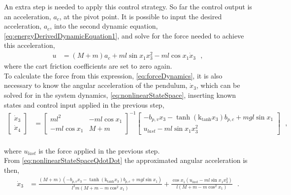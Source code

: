 An extra step is needed to apply this control strategy. So far the control output is an acceleration, $a_c$, at the pivot point. It is possible to input the desired acceleration, $a_c$, into the second dynamic equation, \autoref{eq:energyDerivedDynamicEquation1}, and solve for the force needed to achieve this acceleration,
%
\begin{align}
  u &=  ( M + m )a_c + m l \sin x_1 x_3^2 - m l \cos x_1 \dot{x}_3  \ \ \ ,
  \label{eq:forceDynamics}
\end{align}
%
where the cart friction coefficients are set to zero again.\\
To calculate the force from this expression, \autoref{eq:forceDynamics}, it is also necessary to know the angular acceleration of the pendulum, $\dot{x}_3$, which can be solved for in the system dynamics, \autoref{eq:nonlinearStateSpace}, inserting known states and control input applied in the previous step,
%
\begingroup\makeatletter\def\f@size{10}\check@mathfonts
\def\maketag@@@#1{\hbox{\m@th\normalsize\normalfont#1}}%
\begin{align}
  \begin{bmatrix}
    \dot{x}_3  \\
    \dot{x}_4
  \end{bmatrix}
  &=
  \begin{bmatrix}
    m l^2           & -m l \cos x_1  \\
    -m l \cos x_1   & M + m
  \end{bmatrix}^{-1}
  \begin{bmatrix}
    - b_{p,v} x_3 - \tanh(\text{k}_\text{tanh}x_3) b_{p,c} + m g l \sin x_1 \\
    u_{last} - m l \sin x_1 x_3^2
  \end{bmatrix}
  \ \ \ ,
  \label{eq:nonlinearStateSpaceQdotDot} \\ \nonumber
\end{align}
\endgroup \vspace{-44pt}

%
where $u_{last}$ is the force applied in the previous step.\\
From \autoref{eq:nonlinearStateSpaceQdotDot} the approximated angular acceleration is then,
\begingroup\makeatletter\def\f@size{10}\check@mathfonts
\def\maketag@@@#1{\hbox{\m@th\normalsize\normalfont#1}}%
\begin{align}
\dot{x}_3 &= \frac{ ( M + m )(- b_{p,v} x_3 - \tanh(\text{k}_\text{tanh}x_3) b_{p,c} + m g l \sin x_1) }{ l^2 m ( M + m - m \cos^2 x_1 ) } + \frac{ \cos x_1 (u_{last} - m l \sin x_1 x_3^2) }{ l ( M + m - m \cos^2 x_1 ) }
\ \ \ .
\label{eq:thetaDotDotApprox} \\ \nonumber
\end{align}
\endgroup \vspace{-44pt}

